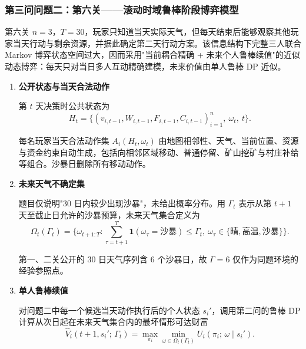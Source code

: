 \documentclass{cumcmthesis}
\numberwithin{equation}{section}
\numberwithin{figure}{section}
\numberwithin{table}{section}
\begin{document}
\subsubsection{第三问问题二：第六关——滚动时域鲁棒阶段博弈模型}

第六关 $n=3$，$T=30$，玩家只知道当天实际天气，但每天结束后能够观察其他玩家当天行动与剩余资源，并据此确定第二天行动方案。该信息结构下完整三人联合 Markov 博弈状态空间过大，因而采用"当前耦合精确 + 未来个人鲁棒续值"的近似动态博弈：每天只对当日多人互动精确建模，未来价值由单人鲁棒 DP 近似。

\begin{enumerate}
    \item \textbf{公开状态与当天合法动作}

\hspace*{2em}第 $t$ 天决策时公共状态为
\vspace{-10pt}
\begin{equation}
H_t=\bigl\{(v_{i,t-1},W_{i,t-1},F_{i,t-1},C_{i,t-1})_{i=1}^n,\ \omega_t,\ t\bigr\}.
\end{equation}

\hspace*{2em}每名玩家当天合法动作集 $A_i(H_t,\omega_t)$ 由地图相邻性、天气、当前位置、资源与资金约束自动生成，包括向相邻区域移动、普通停留、矿山挖矿与村庄补给等组合。沙暴日删除所有移动动作。
 
    \item \textbf{未来天气不确定集}

\hspace*{2em}题目仅说明"30 日内较少出现沙暴"，未给出概率分布。用 $\Gamma_t$ 表示从第 $t+1$ 天至截止日允许的沙暴预算，未来天气集合定义为
\vspace{-8pt}
\begin{equation}
\Omega_t(\Gamma_t)=\bigl\{\omega_{t+1:T}:\sum_{\tau=t+1}^T\mathbf{1}(\omega_\tau=\text{沙暴})\le\Gamma_t,\ \omega_\tau\in\{\text{晴},\text{高温},\text{沙暴}\}\bigr\}.
\end{equation}

\hspace*{2em}第一、二关公开的 30 日天气序列含 6 个沙暴日，故 $\Gamma=6$ 仅作为同题环境的经验参照点。

    \item \textbf{单人鲁棒续值}

\hspace*{2em}对问题二中每一个候选当天动作执行后的个人状态 $s_i'$，调用第二问的鲁棒 DP 计算从次日起在未来天气集合内的最坏情形可达财富
\vspace{-10pt}
\begin{equation}
\hat{V}_i(t{+}1,s_i';\,\Gamma_t)=\max_{\pi_i}\min_{\omega\in\Omega_t(\Gamma_t)}U_i(\pi_i;\,\omega\mid s_i').
\end{equation}


\end{enumerate}
\end{document}
